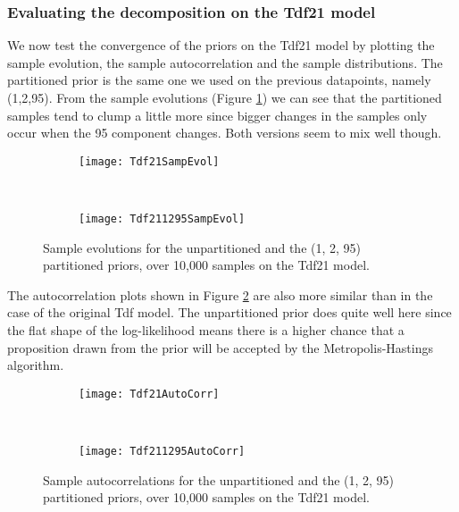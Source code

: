 \subsubsection{Evaluating the decomposition on the Tdf21 model}
We now test the convergence of the priors on the Tdf21 model by plotting the sample evolution, the sample autocorrelation and the sample distributions. The partitioned prior is the same one we used on the previous datapoints, namely (1,2,95). From the sample evolutions (Figure \ref{fig:tdf21PSampEvol}) we can see that the partitioned samples tend to clump a little more since bigger changes in the samples only occur when the 95 component changes. Both versions seem to mix well though.


\begin{figure}[h]
    \centering
    \begin{subfigure}[t]{0.48\textwidth}
      \texttt{[image: Tdf21SampEvol]}
    \end{subfigure}
    ~
    \begin{subfigure}[t]{0.48\textwidth}
      \texttt{[image: Tdf211295SampEvol]}
    \end{subfigure}
    \caption{Sample evolutions for the unpartitioned and the (1, 2, 95) partitioned priors, over 10,000 samples on the Tdf21 model.}
    \label{fig:tdf21PSampEvol}
\end{figure}

The autocorrelation plots shown in Figure \ref{fig:tdf21PAutoCorr} are also more similar than in the case of the original Tdf model. The unpartitioned prior does quite well here since the flat shape of the log-likelihood means there is a higher chance that a proposition drawn from the prior will be accepted by the Metropolis-Hastings algorithm.

\begin{figure}[h]
    \centering
    \begin{subfigure}[t]{0.48\textwidth}
      \texttt{[image: Tdf21AutoCorr]}
    \end{subfigure}
    ~
    \begin{subfigure}[t]{0.48\textwidth}
      \texttt{[image: Tdf211295AutoCorr]}
    \end{subfigure}
    \caption{Sample autocorrelations for the unpartitioned and the (1, 2, 95) partitioned priors, over 10,000 samples on the Tdf21 model.}
    \label{fig:tdf21PAutoCorr}
\end{figure}

